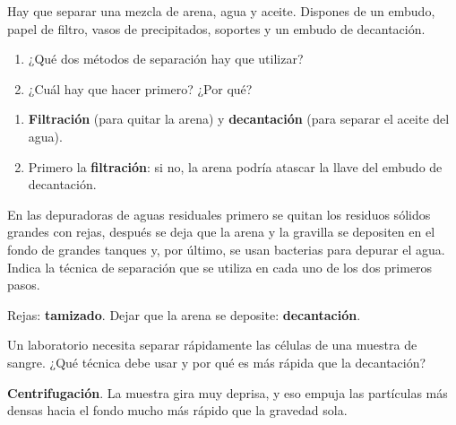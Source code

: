 \begin{exercise}
    Hay que separar una mezcla de arena, agua y aceite. Dispones de un embudo, papel de filtro, vasos de precipitados, soportes y un embudo de decantación.
    \begin{enumerate}[label=\letraminuscula]
        \item ¿Qué dos métodos de separación hay que utilizar?
        \item ¿Cuál hay que hacer primero? ¿Por qué?
    \end{enumerate}
    \begin{solu}
        \begin{enumerate}[label=\alph*)]
            \item \textbf{Filtración} (para quitar la arena) y \textbf{decantación} (para separar el aceite del agua).
            \item Primero la \textbf{filtración}: si no, la arena podría atascar la llave del embudo de decantación.
        \end{enumerate}
    \end{solu}
\end{exercise}

\begin{exercise}
    En las depuradoras de aguas residuales primero se quitan los residuos sólidos grandes con rejas, después se deja que la arena y la gravilla se depositen en el fondo de grandes tanques y, por último, se usan bacterias para depurar el agua. Indica la técnica de separación que se utiliza en cada uno de los dos primeros pasos.
    \begin{solu}
        Rejas: \textbf{tamizado}. Dejar que la arena se deposite: \textbf{decantación}.
    \end{solu}
\end{exercise}

\begin{exercise}
    Un laboratorio necesita separar rápidamente las células de una muestra de sangre. ¿Qué técnica debe usar y por qué es más rápida que la decantación?
    \begin{solu}
        \textbf{Centrifugación}. La muestra gira muy deprisa, y eso empuja las partículas más densas hacia el fondo mucho más rápido que la gravedad sola.
    \end{solu}
\end{exercise}

